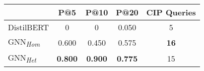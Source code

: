 \begin{tabular}{lcccc}
\toprule
                              & P@5            & P@10           & P@20           & CIP Queries \\
\midrule
DistilBERT                    & 0              & 0              & 0.050          & 5           \\
GNN\textsubscript{\emph{Hom}} & 0.600          & 0.450          & 0.575          & \textbf{16} \\
GNN\textsubscript{\emph{Het}} & \textbf{0.800} & \textbf{0.900} & \textbf{0.775} & 15          \\
\bottomrule
\end{tabular}
